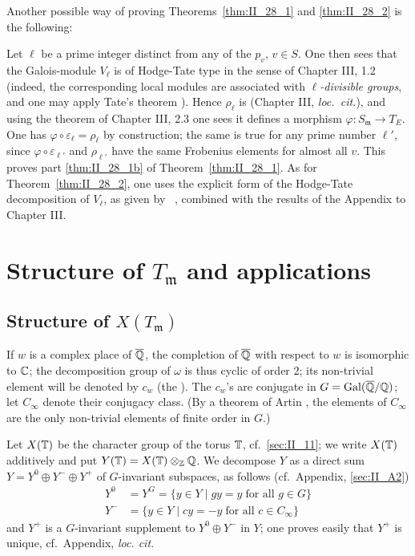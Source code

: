 \begin{obs}
Another possible way of proving Theorems~\ref{thm:II_28_1} and
\ref{thm:II_28_2} is the following:

Let $\ell$ be a prime integer distinct from any of the $p_v$, $v \in S$.  One
then sees that the Galois-module $V_\ell$ is of Hodge-Tate type in the sense of
Chapter III, 1.2 (indeed, the corresponding local modules
\dpage
are associated with \emph{$\ell$-divisible groups}, and one may apply Tate's
theorem \cite{39}). Hence $\rho_\ell$ is  (Chapter
III, \emph{loc.\ cit.}), and using the theorem of Chapter III, 2.3 one sees it
defines a morphism $\varphi \colon S_{\mathfrak{m}} \to T_E$. One has
$\varphi\circ\varepsilon_\ell = \rho_\ell$ by construction; the same is true
for any prime number $\ell'$, since $\varphi\circ\varepsilon_{\ell'}$ and
$\rho_{\ell'}$ have the same Frobenius elements for almost all $v$. This proves
part \ref{thm:II_28_1b} of Theorem~\ref{thm:II_28_1}. As for
Theorem~\ref{thm:II_28_2}, one uses the explicit form of the Hodge-Tate
decomposition of $V_\ell$, as given by \citeauthor{39}~\cite{39}, combined with
the results of the Appendix to Chapter III.
\end{obs}

\section{Structure of \texorpdfstring{$T_{\mathfrak{m}}$}{Tm} and applications}

\subsection{Structure of \texorpdfstring{$X(T_{\mathfrak{m}})$}{X(Tm)}}
\label{sec:II_31}
If $w$ is a complex place of $\overline{\mathbb{Q}}$, the completion of $\overline{\mathbb{Q}}$ with
respect to $w$ is isomorphic to $\mathbb{C}$; the decomposition group of $\omega$ is
thus cyclic of order 2; its non-trivial element will be denoted by $c_w$ (the
). The $c_w$'s are conjugate in
$G = \operatorname{Gal}(\overline{\mathbb{Q}}/\mathbb{Q})$; let $C_\infty$ denote their conjugacy class. (By a
theorem of Artin \cite[257]{1}, the elements of $C_\infty$ are the only
non-trivial elements of finite order in $G$.)

Let $X(\mathbb{T})$ be the character group of the torus $\mathbb{T}$, cf.\ \ref{sec:II_11}; we
write $X(\mathbb{T})$ additively and put $Y(\mathbb{T}) = X(\mathbb{T}) \otimes_{\mathbb{Z}} \mathbb{Q}$. We decompose
$Y$ as a direct sum $Y = Y^0 \oplus Y^- \oplus Y^+$ of $G$-invariant subspaces, as
follows (cf.\ Appendix, \ref{sec:II_A2})
\begin{align*}
	Y^0 &= Y^G = \{ y \in Y \mid gy = y \; \text{for all } g\in G \} \\
	Y^- &= \{ y \in Y \mid cy = -y \; \text{for all } c\in C_\infty \}
\end{align*}
and $Y^+$ is a $G$-invariant supplement to $Y^0 \oplus Y^-$ in $Y$; one proves
\dpage
easily that $Y^+$ is unique, cf.\ Appendix, \emph{loc. cit.}

